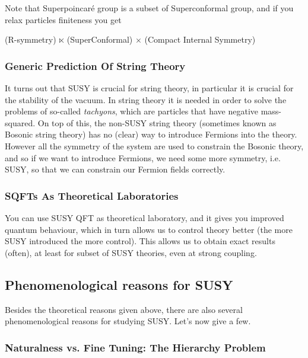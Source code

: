 \br 
     Note that Superpoincar\'{e} group is a subset of Superconformal group, and if you relax particles finiteness you get
    \begin{center}
        (R-symmetry) $\ltimes$ (SuperConformal) $\times$ (Compact Internal Symmetry)
    \end{center}
\er 

\subsubsection{Generic Prediction Of String Theory}

It turns out that SUSY is crucial for string theory, in particular it is crucial for the stability of the vacuum. In string theory it is needed in order to solve the problems of so-called \textit{tachyons}, which are particles that have negative mass-squared. On top of this, the non-SUSY string theory (sometimes known as Bosonic string theory) has no (clear) way to introduce Fermions into the theory. However all the symmetry of the system are used to constrain the Bosonic theory, and so if we want to introduce Fermions, we need some more symmetry, i.e. SUSY, so that we can constrain our Fermion fields correctly. 

\subsubsection{SQFTs As Theoretical Laboratories}

You can use SUSY QFT as theoretical laboratory, and it gives you improved quantum behaviour, which in turn allows us to control theory better (the more SUSY introduced the more control). This allows us to obtain exact results (often), at least for subset of SUSY theories, even at strong coupling.

\subsection{Phenomenological reasons for SUSY}

Besides the theoretical reasons given above, there are also several phenomenological reasons for studying SUSY. Let's now give a few. 

\subsubsection{Naturalness vs. Fine Tuning: The Hierarchy Problem}

